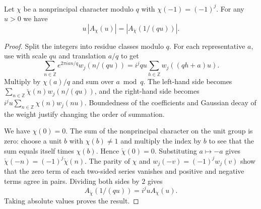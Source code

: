\begin{lemma}
\label{lem:theta-poisson-classes}
\emitthmsource
Let $\chi$ be a nonprincipal character modulo $q$ with $\chi(-1)=(-1)^j$. For any $u>0$ we have
\[
 u\,|A_\chi(u)|=|A_{\check\chi}(1/(qu))|.
\]
\end{lemma}
\begin{proof}
Split the integers into residue classes modulo $q$. For each representative $a$, use 
with scale $qu$ and translation $a/q$ to get
\[
 \sum_{n\in\mathbb Z} e^{2\pi ian/q}w_j(n/(qu))
 =i^jqu\sum_{h\in\mathbb Z}w_j((qh+a)u).
\]
Multiply by $\chi(a)/q$ and sum over $a\bmod q$. The left-hand side becomes $\sum_{n\in\mathbb Z}\check\chi(n)w_j(n/(qu))$,
and the right-hand side becomes $i^j u\sum_{n\in\mathbb Z}\chi(n)w_j(nu)$.
Boundedness of the coefficients and Gaussian decay of the weight justify changing the order of summation.

We have $\chi(0)=0$. The sum of the nonprincipal character on the unit group is zero: choose a unit $b$ with $\chi(b)\ne1$ and multiply the index by $b$ to see that the sum equals itself times $\chi(b)$. Hence $\check\chi(0)=0$.
Substituting $a\mapsto-a$ gives $\check\chi(-n)=(-1)^j\check\chi(n)$.
The parity of $\chi$ and $w_j(-v)=(-1)^jw_j(v)$ show that the zero term of each two-sided series vanishes and positive and negative terms agree in pairs. Dividing both sides by $2$ gives
\[
 A_{\check\chi}(1/(qu))=i^j u A_\chi(u).
\]
Taking absolute values proves the result.
\end{proof}

